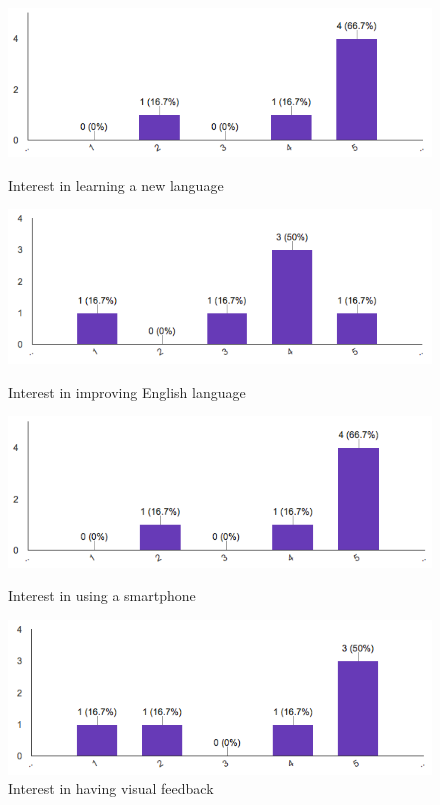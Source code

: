 \begin{figure}[!ht]
	\centering
	\begin{minipage}{.5\textwidth}
		\centering
		\includegraphics[scale=0.5]{Figures/responses/interest_learning_language.png}
		\caption{Interest in learning a new language}
		\label{fig:int_improving_lang}
	\end{minipage}%
	\begin{minipage}{.5\textwidth}
		\centering
		\includegraphics[scale=0.5]{Figures/responses/interest_improving_lang.png}
		\caption{Interest in improving English language}
		\label{fig:int_learnign_lang}
	\end{minipage}
    \begin{minipage}{.5\textwidth}
        \centering
        \includegraphics[scale=0.5]{Figures/responses/interest_usage_smartphone.png}
        \caption{Interest in using a smartphone}
        \label{fig:int_usage_smartphone}
    \end{minipage}%
	\begin{minipage}{.5\textwidth}
		\centering
		\includegraphics[scale=0.5]{Figures/responses/interest_visual_feedback.png}
		\caption{Interest in having visual feedback}
		\label{fig:int_visual_feedbak}
	\end{minipage}%
\end{figure}

